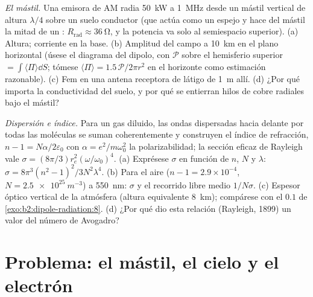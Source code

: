 \begin{exercise}[$\star\star\star$]\label{exo:b2:dipole-radiation:11}
\emph{El mástil.} Una emisora de AM radia \qty{50}{kW} a \qty{1}{MHz} desde un
mástil vertical de altura $\lambda/4$ sobre un suelo conductor (que actúa
como un espejo y hace del mástil la mitad de un : $R_{\text{rad}} \approx
\qty{36}{\ohm}$, y la potencia va solo al semiespacio superior). (a)
Altura; corriente en la base. (b) Amplitud del campo a \qty{10}{km} en el
plano horizontal (úsese el diagrama del dipolo, con $\mathcal P$ sobre el
hemisferio superior $= \int\langle\Pi\rangle\dd S$; tómese $\langle\Pi\rangle = 1.5\,
\mathcal P/2\pi r^2$ en el horizonte como estimación razonable). (c) Fem en una
antena receptora de látigo de \qty{1}{m} allí. (d) ¿Por qué importa la conductividad del suelo,
y por qué se entierran hilos de cobre radiales bajo el mástil?
\end{exercise}

\begin{exercise}[$\star\star\star$]\label{exo:b2:dipole-radiation:12}
\emph{Dispersión e índice.} Para un gas diluido, las ondas dispersadas hacia
delante por todas las moléculas se suman coherentemente y construyen el índice de refracción,
$n - 1 = N\alpha/2\varepsilon_0$ con $\alpha = e^2/m\omega_0^2$ la polarizabilidad; la
sección eficaz de Rayleigh vale $\sigma = (8\pi/3)r_e^2(\omega/\omega_0)^4$. (a) Exprésese
$\sigma$ en función de $n$, $N$ y $\lambda$: $\sigma = 8\pi^3(n^2 - 1)^2/3N^2\lambda^4$. (b)
Para el aire ($n - 1 = 2.9 \times 10^{-4}$, $N = \qty{2.5e25}{m^{-3}}$) a \qty{550}{nm}:
$\sigma$ y el recorrido libre medio $1/N\sigma$. (c) Espesor óptico vertical de la
atmósfera (altura equivalente \qty{8}{km}); compárese con el $0.1$ de
\cref{exo:b2:dipole-radiation:8}. (d) ¿Por qué dio esta relación (Rayleigh,
1899) un valor del número de Avogadro?
\end{exercise}

\section{Problema: el mástil, el cielo y el electrón}


